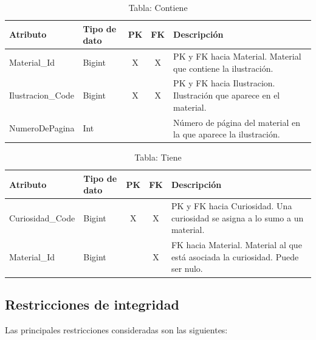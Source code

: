 \documentclass[12pt,a4paper]{article}
\begin{document}
\begin{table}[H]
\centering
\begin{tabularx}{\textwidth}{|l|l|c|c|X|}
\hline
\textbf{Atributo} & \textbf{Tipo de dato} & \textbf{PK} & \textbf{FK} & \textbf{Descripción} \\ \hline
Material\_Id      & Bigint & X & X & PK y FK hacia Material. Material que contiene la ilustración. \\ \hline
Ilustracion\_Code & Bigint & X & X & PK y FK hacia Ilustracion. Ilustración que aparece en el material. \\ \hline
NumeroDePagina    & Int    & & & Número de página del material en la que aparece la ilustración. \\ \hline
\end{tabularx}
\caption{Tabla: Contiene}
\end{table}

\begin{table}[H]
\centering
\begin{tabularx}{\textwidth}{|l|l|c|c|X|}
\hline
\textbf{Atributo} & \textbf{Tipo de dato} & \textbf{PK} & \textbf{FK} & \textbf{Descripción} \\ \hline
Curiosidad\_Code & Bigint & X & X & PK y FK hacia Curiosidad. Una curiosidad se asigna a lo sumo a un material. \\ \hline
Material\_Id     & Bigint & & X & FK hacia Material. Material al que está asociada la curiosidad. Puede ser nulo. \\ \hline
\end{tabularx}
\caption{Tabla: Tiene}
\end{table}



\subsection{Restricciones de integridad}

Las principales restricciones consideradas son las siguientes:
\end{document}
